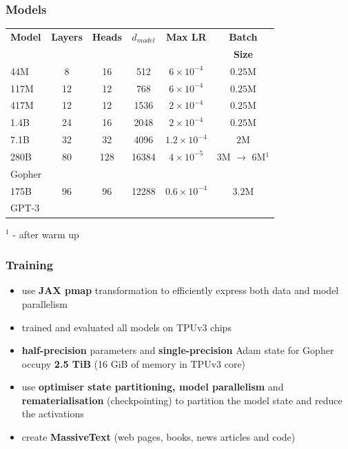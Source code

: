 \documentclass{beamer}
\begin{document}
\begin{frame}
    \frametitle{Models}
    \begin{center}
        \begin{tabular}{ l | c | c | c | c | c }
        \textbf{Model} & \textbf{Layers} & \textbf{Heads} & \textbf{$d_{model}$} & \textbf{Max LR} & \textbf{Batch} \\
        & & & & & \textbf{Size} \\
        \hline
        44M  & 8  & 16  & 512   & $6 \times 10^{-4}$ & $0.25$M \\
        117M & 12 & 12  & 768   & $6 \times 10^{-4}$ & $0.25$M \\
        417M & 12 & 12  & 1536  & $2 \times 10^{-4}$ & $0.25$M \\
        1.4B & 24 & 16  & 2048  & $2 \times 10^{-4}$ & $0.25$M \\
        7.1B & 32 & 32  & 4096  & $1.2 \times 10^{-4}$ & $2$M \\
        \hline
        280B & 80 & 128 & 16384 & $4 \times 10^{-5}$ & $3$M $\rightarrow$ $6$M$^{1}$ \\
        Gopher & & & & & \\
        \hline
        175B & 96 & 96  & 12288 & $0.6 \times 10^{-4}$ & $3.2$M \\
        GPT-3 & & & & & \\
        \end{tabular}
    \end{center}

    \tiny{$^{1}$ - after warm up}
\end{frame}

\begin{frame}
    \frametitle{Training}
    \begin{itemize}
        \item use \textbf{JAX pmap} transformation to efficiently express both data and model parallelism
        \item trained and evaluated all models on TPUv3 chips
        \item \textbf{half-precision} parameters and \textbf{single-precision} Adam state for Gopher occupy \textbf{2.5 TiB} (16 GiB of memory in TPUv3 core)
        \item use \textbf{optimiser state partitioning, model parallelism} and \textbf{rematerialisation} (checkpointing) to partition the model state and reduce the activations
        \item create \textbf{MassiveText} (web pages, books, news articles and code)
    \end{itemize}
\end{frame}
\end{document}
